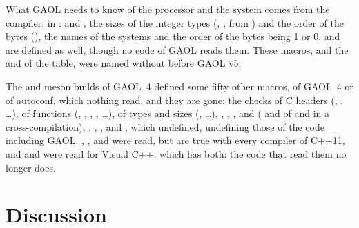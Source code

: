 \documentclass[12pt,a4paper,twoside,openright]{book}
\begin{document}
\noindent
What GAOL needs to know of the processor and the system comes from the
compiler, in :  and
, the sizes of the integer types
(, , from
) and the order of the bytes (),
the names of the systems and the order of the bytes being 1 or 0.
 and  are defined as well,
though no code of GAOL reads them. These macros, and the
 and  of the table, were named
without  before GAOL v5.\newinvfive

\begin{Rem}
The  and meson builds of GAOL~4 defined some fifty other
macros, of GAOL~4 or of autoconf, which nothing read, and they are
gone:\newinvfive{} the checks of C headers (,
, \ldots), of functions
(, , ,
, \ldots), of types and sizes
(, \ldots), ,
, ,  and 
( and  of 
and  in a cross-compilation),
, , , 
and , which  undefined, undefining
those of the code including GAOL. , ,
 and  were read, but are true
with every compiler of C++11, and  and
 were read for Visual C++, which has both: the code that
read them no longer does.
\end{Rem}

\section{Discussion}
\end{document}

